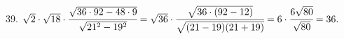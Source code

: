 39. $\sqrt{2}\cdot\sqrt{18}\cdot\cfrac{\sqrt{36\cdot92-48\cdot9}}{\sqrt{21^2-19^2}}=
\sqrt{36}\cdot\cfrac{\sqrt{36\cdot(92-12)}}{\sqrt{(21-19)(21+19)}}=6\cdot\cfrac{6\sqrt{80}}{\sqrt{80}}=36.$\\
